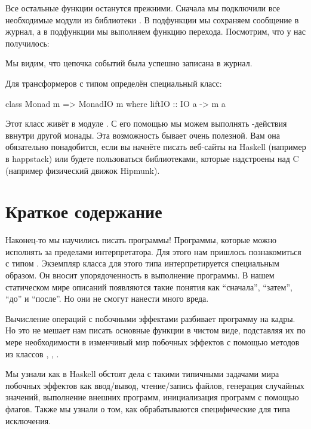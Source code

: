 Все остальные функции останутся прежними. Сначала мы подключили все
необходимые модули из библиотеки . В подфункции
 мы сохраняем сообщение в журнал, а в подфункции  мы
выполняем функцию перехода. Посмотрим, что у нас получилось:



Мы видим, что цепочка событий была успешно записана в журнал.

Для трансформеров с типом  определён специальный класс:


\begin{code}
class Monad m => MonadIO m where
    liftIO :: IO a -> m a
\end{code}

Этот класс живёт в модуле . С его помощью мы
можем выполнять -действия ввнутри другой монады. Эта возможность
бывает очень полезной. Вам она обязательно понадобится, если вы начнёте
писать веб-сайты на Haskell (например в happstack) или будете
пользоваться библиотеками, которые надстроены над C (например физический
движок Hipmunk).

\section{Краткое содержание}

Наконец-то мы научились писать программы! Программы, которые можно
исполнять за пределами интерпретатора. Для этого нам пришлось
познакомиться с типом . Экземпляр класса  для этого
типа интерпретируется специальным образом. Он вносит упорядоченность в
выполнение программы. В нашем статическом мире описаний появляются такие
понятия как ``сначала'', ``затем'', ``до'' и ``после''. Но они не смогут
нанести много вреда.

Вычисление операций с побочными эффектами разбивает программу на кадры.
Но это не мешает нам писать основные функции в чистом виде, подставляя
их по мере необходимости в изменчивый мир побочных эффектов с помощью
методов из классов , , .

Мы узнали как в Haskell обстоят дела с такими типичными задачами мира
побочных эффектов как ввод/вывод, чтение/запись файлов, генерация
случайных значений, выполнение внешних программ, инициализация программ
с помощью флагов. Также мы узнали о том, как обрабатываются
специфические для типа  исключения.

